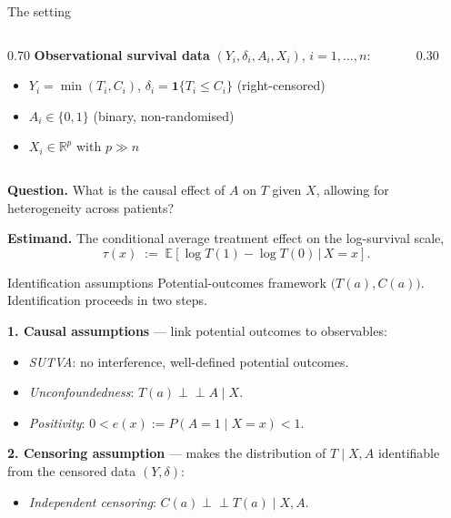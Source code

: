 \documentclass[10pt,aspectratio=169]{beamer}
\newcommand{\E}{\mathbb{E}}
\newcommand{\R}{\mathbb{R}}
\newcommand{\indep}{\perp\!\!\!\perp}
\begin{document}
\begin{frame}{The setting}
\begin{columns}[T,onlytextwidth]
\begin{column}{0.70\textwidth}
\textbf{Observational survival data} $(Y_i, \delta_i, A_i, X_i)$, $i=1,\ldots,n$:
\begin{itemize}
  \item $Y_i = \min(T_i, C_i)$, $\delta_i = \mathbf{1}\{T_i \le C_i\}$ \quad (right-censored)
  \item $A_i \in \{0,1\}$ \quad (binary, non-randomised)
  \item $X_i \in \R^p$ \quad with $p \gg n$
\end{itemize}
\end{column}
\begin{column}{0.30\textwidth}
\centering
{}
\end{column}
\end{columns}

\bigskip

\textbf{Question.} What is the causal effect of $A$ on $T$ given $X$, allowing for heterogeneity across patients?
\bigskip

\textbf{Estimand.} The conditional average treatment effect on the log-survival scale,
\[
\tau(x) \;:=\; \E\left[\log T(1) - \log T(0)\,\big|\, X = x\right].
\]
\end{frame}

\begin{frame}{Identification assumptions}
Potential-outcomes framework $\bigl(T(a), C(a)\bigr)$. Identification proceeds in two steps.

\medskip

\textbf{1. Causal assumptions} --- link potential outcomes to observables:
\begin{itemize}
  \item \textit{SUTVA}: no interference, well-defined potential outcomes.
  \item \textit{Unconfoundedness}: $T(a) \indep A \mid X$.
  \item \textit{Positivity}: $0 < e(x) := P(A{=}1 \mid X{=}x) < 1$.
\end{itemize}


\vspace{0.6cm}
\textbf{2. Censoring assumption} --- makes the distribution of $T \mid X, A$ identifiable from the censored data $(Y,\delta)$:
\begin{itemize}
  \item \textit{Independent censoring}: $C(a) \indep T(a) \mid X, A$.
\end{itemize}


\end{frame}
\end{document}
